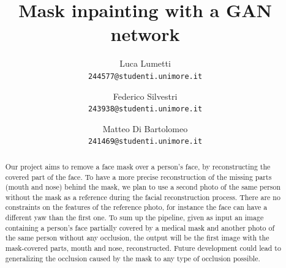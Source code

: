 \documentclass[10pt,twocolumn,letterpaper]{article}
\begin{document}
\title{Mask inpainting with a GAN network}

\author{Luca Lumetti\\
{\tt\small 244577@studenti.unimore.it}
\and
Federico Silvestri\\
{\tt\small 243938@studenti.unimore.it}
\and
Matteo Di Bartolomeo\\
{\tt\small 241469@studenti.unimore.it}
}

\maketitle

\begin{abstract}
  Our project aims to remove a face mask over a person’s face, by reconstructing
  the covered part of the face. To have a more precise reconstruction of the
  missing parts (mouth and nose) behind the mask, we plan to use a second photo
  of the same person without the mask as a reference during the facial
  reconstruction process. There are no constraints on the features of the
  reference photo, for instance the face can have a different yaw than the first
  one. To sum up the pipeline, given as input an image containing a person’s
  face partially covered by a medical mask and another photo of the same person
  without any occlusion, the output will be the first image with the
  mask-covered parts, mouth and nose, reconstructed. Future development could
  lead to generalizing the occlusion caused by the mask to any type of occlusion
  possible.
\end{abstract}

\end{document}
